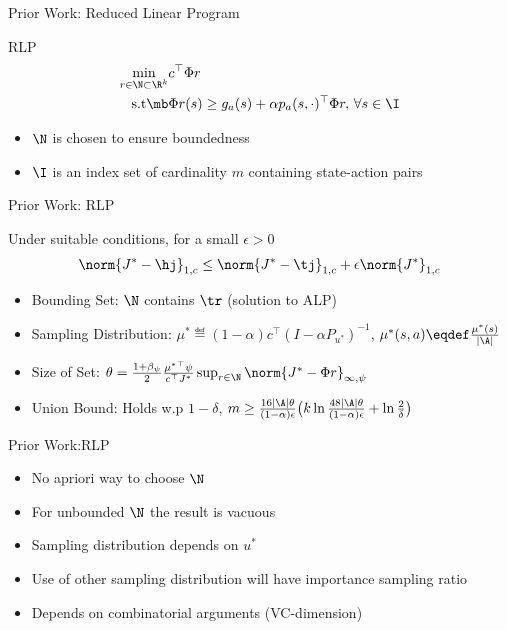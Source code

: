 \documentclass[handout,10pt]{beamer}
\begin{document}
\begin{frame}[fragile]{Prior Work: Reduced Linear Program}
\begin{block}{RLP \cite{de2004constraint}}
\begin{align*}
\min_{r\in \N\subset\R^k} &c^\top \Phi r\\
\text{s.t}\mb &\Phi r (s)\geq g_a(s)+\alpha p_a(s,\cdot)^\top \Phi r,\,\forall s\in \I
\end{align*}

\begin{itemize}
\item $\N$ is chosen to ensure boundedness
\item $\I$ is an index set of cardinality $m$ containing state-action pairs
\end{itemize}
\end{block}
\end{frame}
\begin{frame}[fragile]{Prior Work: RLP}
\begin{block}{\cite{de2004constraint}}
Under suitable conditions, for a small $\epsilon>0$
\begin{align*}
\norm{J^*-\hj}_{1,c}\leq \norm{J^*-\tj}_{1,c}+\epsilon\norm{J^*}_{1,c}
\end{align*}
\end{block}
\begin{itemize}
\item Bounding Set: $\N$ contains $\tr$ (solution to ALP)
\item Sampling Distribution: $\mu^*\eqdef(1-\alpha)c^\top (I-\alpha P_{u^*})^{-1}$, $\mu^*(s,a)\eqdef\frac{\mu^*(s)}{|\A|}$
\item Size of Set: $\theta=\frac{1+\beta_{\psi}}{2}\frac{{\mu^*}^\top \psi}{c^\top J^*}\sup_{r\in \N}\norm{J^*-\Phi r}_{\infty,\psi}$
\item Union Bound: Holds w.p $1-\delta$,  $m\geq \frac{16|\A|\theta}{(1-\alpha)\epsilon}\big(k\ln \frac{48|\A|\theta}{(1-\alpha)\epsilon}+\ln\frac{2}{\delta}\big)$
\end{itemize}
\end{frame}
\begin{frame}[fragile]{Prior Work:RLP}
\begin{block}{\cite{de2004constraint}}
\begin{itemize}
\item No apriori way to choose $\N$
\item For unbounded $\N$ the result is vacuous
\item Sampling distribution depends on $u^*$
\item Use of other sampling distribution will have importance sampling ratio
\item Depends on combinatorial arguments (VC-dimension)
\end{itemize}
\end{block}
\end{frame}
\end{document}
